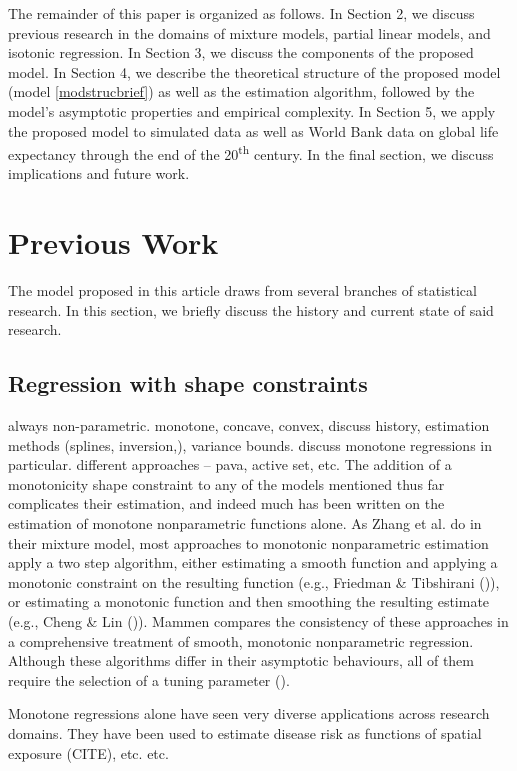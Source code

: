 \documentclass[fleqn,10pt]{olplainarticle}\usepackage[]{graphicx}\usepackage[]{color}
\begin{document}
The remainder of this paper is organized as follows. In Section 2, we discuss previous research in the domains of mixture models, partial linear models, and isotonic regression. In Section 3, we discuss the components of the proposed model. In Section 4, we describe the theoretical structure of the proposed model (model \ref{modstrucbrief}) as well as the estimation algorithm, followed by the model's asymptotic properties and empirical complexity. In Section 5, we apply the proposed model to simulated data as well as World Bank data on global life expectancy through the end of the 20\textsuperscript{th} century. In the final section, we discuss implications and future work.


\section{Previous Work}

The model proposed in this article draws from several branches of statistical research. In this section, we briefly discuss the history and current state of said research.

\subsection{Regression with shape constraints}

always non-parametric. monotone, concave, convex,
discuss history, estimation methods (splines, inversion,), variance bounds.
discuss monotone regressions in particular. different approaches -- pava, active set, etc.
The addition of a monotonicity shape constraint to any of the models mentioned thus far complicates their estimation, and indeed much has been written on the estimation of monotone nonparametric functions alone. As Zhang et al. do in their mixture model, most approaches to monotonic nonparametric estimation apply a two step algorithm, either estimating a smooth function and applying a monotonic constraint on the resulting function (e.g., Friedman \& Tibshirani (\cite{friedman})), or estimating a monotonic function and then smoothing the resulting estimate (e.g., Cheng \& Lin (\cite{cheng})). Mammen compares the consistency of these approaches in a comprehensive treatment of smooth, monotonic nonparametric regression. Although these algorithms differ in their asymptotic behaviours, all of them require the selection of a tuning parameter (\cite{mammen}).

Monotone regressions alone have seen very diverse applications across research domains. They have been used to estimate disease risk as functions of spatial exposure (CITE), etc. etc.
\end{document}
